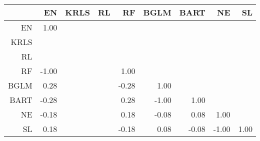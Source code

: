 \begin{table}[ht]
\centering
\begin{tabular}{rrrrrrrrr}
  \hline
 & EN & KRLS & RL & RF & BGLM & BART & NE & SL \\ 
  \hline
EN & 1.00 &  &  &  &  &  &  &  \\ 
  KRLS &  &  &  &  &  &  &  &  \\ 
  RL &  &  &  &  &  &  &  &  \\ 
  RF & -1.00 &  &  & 1.00 &  &  &  &  \\ 
  BGLM & 0.28 &  &  & -0.28 & 1.00 &  &  &  \\ 
  BART & -0.28 &  &  & 0.28 & -1.00 & 1.00 &  &  \\ 
  NE & -0.18 &  &  & 0.18 & -0.08 & 0.08 & 1.00 &  \\ 
  SL & 0.18 &  &  & -0.18 & 0.08 & -0.08 & -1.00 & 1.00 \\ 
   \hline
\end{tabular}
\end{table}
